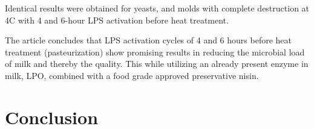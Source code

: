 \vline

Identical results were obtained for yeasts, and molds with complete destruction at 4\textdegree C with 4 and 6-hour LPS activation before heat treatment. 

\vline

The article concludes that LPS activation cycles of 4 and 6 hours before heat treatment (pasteurization) show promising results in reducing the microbial load of milk and thereby the quality. This while utilizing an already present enzyme in milk, LPO, combined with a food grade approved preservative nisin.

\section{Conclusion}
